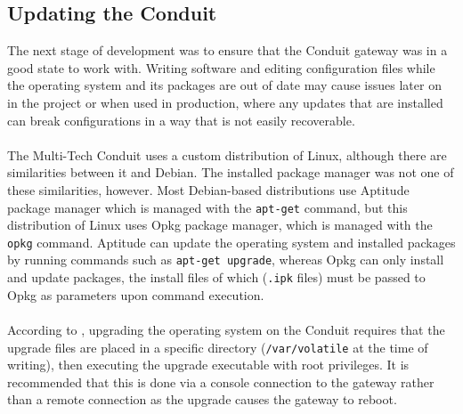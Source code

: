 \subsection{Updating the Conduit}
\label{subsection:dev-sysprep-updates}
The next stage of development was to ensure that the Conduit gateway was in a good state to work with. Writing software and editing configuration files while the operating system and its packages are out of date may cause issues later on in the project or when used in production, where any updates that are installed can break configurations in a way that is not easily recoverable.\\\\
The Multi-Tech Conduit uses a custom distribution of Linux, although there are similarities between it and Debian. The installed package manager was not one of these similarities, however. Most Debian-based distributions use Aptitude package manager which is managed with the \verb|apt-get| command, but this distribution of Linux uses Opkg package manager, which is managed with the \verb|opkg| command. Aptitude can update the operating system and installed packages by running commands such as \verb|apt-get upgrade|, whereas Opkg can only install and update packages, the install files of which (\verb|.ipk| files) must be passed to Opkg as parameters upon command execution. \\\\
According to \cite{multitech-dev-osupgrade}, upgrading the operating system on the Conduit requires that the upgrade files are placed in a specific directory (\verb|/var/volatile| at the time of writing), then executing the upgrade executable with root privileges. It is recommended that this is done via a console connection to the gateway rather than a remote connection as the upgrade causes the gateway to reboot.

